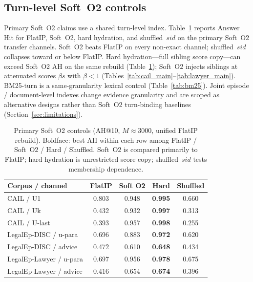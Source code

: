 \documentclass[preprint,12pt,authoryear]{elsarticle}
\newcommand{\compacttab}{\setlength{\tabcolsep}{4.5pt}\renewcommand{\arraystretch}{1.05}}
\begin{document}
\subsection{Turn-level Soft~O2 controls}\label{sec:s1-strong-baselines}
Primary Soft~O2 claims use a shared turn-level index.
Table~\ref{tab:soft-o2-controls} reports Answer Hit for FlatIP, Soft~O2, hard hydration, and shuffled~$sid$ on the primary Soft~O2 transfer channels.
Soft~O2 beats FlatIP on every non-exact channel; shuffled~$sid$ collapses toward or below FlatIP.
Hard hydration---full sibling score copy---can exceed Soft~O2 AH on the same rebuild (Table~\ref{tab:soft-o2-controls}); Soft~O2 injects siblings at attenuated scores $\beta s$ with $\beta{<}1$ (Tables~\ref{tab:cail_main}--\ref{tab:lawyer_main}).
BM25-turn is a same-granularity lexical control (Table~\ref{tab:bm25}).
Joint episode / document-level indexes change evidence granularity and are scoped as alternative designs rather than Soft~O2 turn-binding baselines (Section~\ref{sec:limitations}).

\begin{table}[t]
\centering
\caption{Primary Soft~O2 controls (AH@10, $M{\approx}3000$, unified FlatIP rebuild). Boldface: best AH within each row among FlatIP / Soft~O2 / Hard / Shuffled. Soft~O2 is compared primarily to FlatIP; hard hydration is unrestricted score copy; shuffled~$sid$ tests membership dependence.}
\label{tab:soft-o2-controls}
\compacttab\footnotesize
\begin{tabular}{@{}lcccc@{}}
\toprule
\textbf{Corpus / channel} & \textbf{FlatIP} & \textbf{Soft O2} & \textbf{Hard} & \textbf{Shuffled} \\
\midrule
CAIL / U1 & 0.803 & 0.948 & \textbf{0.995} & 0.660 \\
CAIL / Uk & 0.432 & 0.932 & \textbf{0.997} & 0.313 \\
CAIL / U-last & 0.393 & 0.957 & \textbf{0.998} & 0.255 \\
LegalEp-DISC / u-para & 0.696 & 0.883 & \textbf{0.972} & 0.620 \\
LegalEp-DISC / advice & 0.472 & 0.610 & \textbf{0.648} & 0.434 \\
LegalEp-Lawyer / u-para & 0.697 & 0.956 & \textbf{0.978} & 0.675 \\
LegalEp-Lawyer / advice & 0.416 & 0.654 & \textbf{0.674} & 0.396 \\
\bottomrule
\end{tabular}
\end{table}
\end{document}
